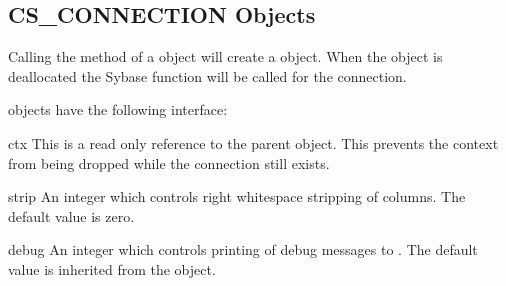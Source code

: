 \subsection{CS_CONNECTION Objects}

Calling the  method of a 
object will create a  object.  When the
 object is deallocated the Sybase
 function will be called for the connection.

 objects have the following interface:

\begin{memberdesc}[CS_CONNECTION]{ctx}
This is a read only reference to the parent  object.
This prevents the context from being dropped while the connection
still exists.
\end{memberdesc}

\begin{memberdesc}[CS_CONNECTION]{strip}
An integer which controls right whitespace stripping of 
columns.  The default value is zero.
\end{memberdesc}

\begin{memberdesc}[CS_CONNECTION]{debug}
An integer which controls printing of debug messages to .
The default value is inherited from the  object.
\end{memberdesc}

